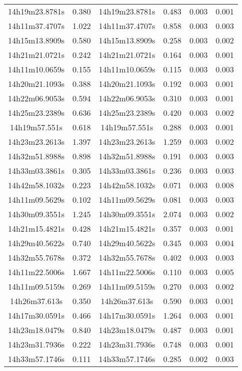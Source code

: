 \begin{table}
\begin{tabular}{cccccc}
14h19m23.8781s & 0.380 & 14h19m23.8781s & 0.483 & 0.003 & 0.001 \\
14h11m37.4707s & 1.022 & 14h11m37.4707s & 0.858 & 0.003 & 0.003 \\
14h15m13.8909s & 0.580 & 14h15m13.8909s & 0.258 & 0.003 & 0.002 \\
14h21m21.0721s & 0.242 & 14h21m21.0721s & 0.164 & 0.003 & 0.001 \\
14h11m10.0659s & 0.155 & 14h11m10.0659s & 0.115 & 0.003 & 0.003 \\
14h20m21.1093s & 0.388 & 14h20m21.1093s & 0.192 & 0.003 & 0.001 \\
14h22m06.9053s & 0.594 & 14h22m06.9053s & 0.310 & 0.003 & 0.001 \\
14h25m23.2389s & 0.636 & 14h25m23.2389s & 0.420 & 0.003 & 0.002 \\
14h19m57.551s & 0.618 & 14h19m57.551s & 0.288 & 0.003 & 0.001 \\
14h23m23.2613s & 1.397 & 14h23m23.2613s & 1.259 & 0.003 & 0.002 \\
14h32m51.8988s & 0.898 & 14h32m51.8988s & 0.191 & 0.003 & 0.003 \\
14h33m03.3861s & 0.305 & 14h33m03.3861s & 0.236 & 0.003 & 0.003 \\
14h42m58.1032s & 0.223 & 14h42m58.1032s & 0.071 & 0.003 & 0.008 \\
14h11m09.5629s & 0.102 & 14h11m09.5629s & 0.081 & 0.003 & 0.003 \\
14h30m09.3551s & 1.245 & 14h30m09.3551s & 2.074 & 0.003 & 0.002 \\
14h21m15.4821s & 0.428 & 14h21m15.4821s & 0.357 & 0.003 & 0.001 \\
14h29m40.5622s & 0.740 & 14h29m40.5622s & 0.345 & 0.003 & 0.004 \\
14h32m55.7678s & 0.372 & 14h32m55.7678s & 0.402 & 0.003 & 0.003 \\
14h11m22.5006s & 1.667 & 14h11m22.5006s & 0.110 & 0.003 & 0.005 \\
14h11m09.5159s & 0.269 & 14h11m09.5159s & 0.270 & 0.003 & 0.002 \\
14h26m37.613s & 0.350 & 14h26m37.613s & 0.590 & 0.003 & 0.001 \\
14h17m30.0591s & 0.466 & 14h17m30.0591s & 1.264 & 0.003 & 0.001 \\
14h23m18.0479s & 0.840 & 14h23m18.0479s & 0.487 & 0.003 & 0.001 \\
14h23m31.7936s & 0.222 & 14h23m31.7936s & 0.748 & 0.003 & 0.001 \\
14h33m57.1746s & 0.111 & 14h33m57.1746s & 0.285 & 0.002 & 0.003 \\

\end{tabular}
\end{table}
